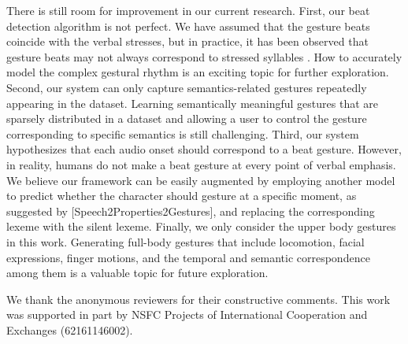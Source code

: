 \documentclass[acmtog,authorversion]{acmart}
\begin{document}
There is still room for improvement in our current research. 
First, our beat detection algorithm is not perfect. We have assumed that the gesture beats coincide with the verbal stresses, but in practice, it has been observed that gesture beats may not always correspond to stressed syllables \cite{mcclave1994gestural}. 
How to accurately model the complex gestural rhythm is an exciting topic for further exploration.
Second, our system can only capture semantics-related gestures repeatedly appearing in the dataset. Learning semantically meaningful gestures that are sparsely distributed in a dataset and allowing a user to control the gesture corresponding to specific semantics is still challenging.
Third, our system hypothesizes that each audio onset should correspond to a beat gesture. However, in reality, humans do not make a beat gesture at every point of verbal emphasis. We believe our framework can be easily augmented by employing another model to predict whether the character should gesture at a specific moment, as suggested by [Speech2Properties2Gestures], and replacing the corresponding lexeme with the silent lexeme.
Finally, we only consider the upper body gestures in this work. Generating full-body gestures that include locomotion, facial expressions, finger motions, and the temporal and semantic correspondence among them is a valuable topic for future exploration. 
\begin{acks}
    We thank the anonymous reviewers for their constructive comments.
    This work was supported in part by NSFC Projects of International Cooperation and Exchanges (62161146002).
\end{acks}
     


\end{document}
